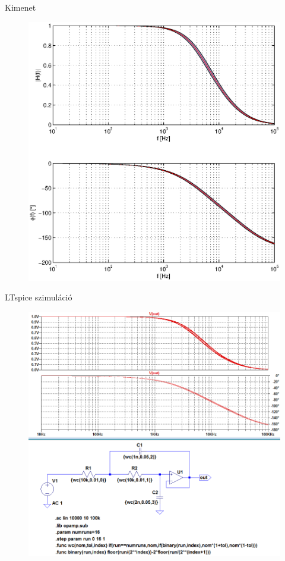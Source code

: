 \documentclass[12pt,a4paper]{report}
\begin{document}
{\centering\huge Kimenet\\}

\begin{figure}[H]
	\centering
	\includegraphics{output.eps}
\end{figure}

\clearpage

{\centering\huge LTspice szimul\'{a}ci\'{o}\\}

\begin{figure}[H]
	\centering
	\includegraphics[scale=0.5]{ltspice.png}
\end{figure}
\end{document}
